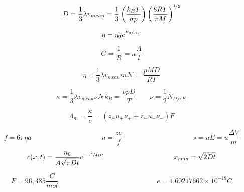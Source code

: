 \documentclass[12pt, letterpaper]{memoir}
\begin{document}
\noindent
\begin{minipage}[t]{0.5\linewidth}
	\begin{equation*}
		D=\frac{1}{3}\lambda v_{mean}=\frac{1}{3}\left(\frac{k_BT}{\sigma p}\right)\left(\frac{8RT}{\pi M}\right)^{\nicefrac{1}{2}}
	\end{equation*}

	\begin{equation*}
		\eta=\eta_0e^{\nicefrac{E_a}{RT}}
	\end{equation*}

	\begin{equation*}
		G=\frac{1}{R}=\kappa\frac{A}{l}
	\end{equation*}	
\end{minipage}
\begin{minipage}[t]{0.5\linewidth}	
	\begin{equation*}
		\eta = \frac{1}{3}\lambda v_{mean}m\mathcal{N}=\frac{pMD}{RT}
	\end{equation*}

	\begin{equation*}
		\kappa = \frac{1}{3} \lambda v_{mean}\nu\mathcal{N}k_B =  \frac{\nu pD}{T} \hspace{2em} \nu=\frac{1}{2}N_{D.o.F.}
	\end{equation*}

	\begin{equation*}
		\Lambda_m = \frac{\kappa}{c}=\left(z_+u_+\nu_++z_-u_-\nu_-\right)F
	\end{equation*}
\end{minipage}

\begin{equation*}
	f=6\pi\eta a \hspace{10em} u = \frac{ze}{f} \hspace{10em} s=uE=u\frac{\Delta V}{m}
\end{equation*}

\begin{equation*}
	c(x,t)=\frac{n_0}{A\sqrt{\pi Dt}}e^{-\nicefrac{x^2}{4Dt}} \hspace{10em} x_{rms}=\sqrt{2Dt}
\end{equation*}

\begin{equation*}
	F=96,485\frac{C}{mol} \hspace{14em} e=1.60217662\times10^{-19} C
\end{equation*}
\end{document}
